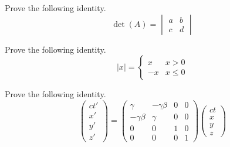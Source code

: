 \documentclass[12pt,a5paper]{exam}
\begin{document}
\begin{questions}
\question
Prove the following identity.
\[
\det (A)=\begin{vmatrix} a & b \\ c& d\end{vmatrix}
\]

\question
Prove the following identity.
\[
|x|=\begin{cases} x & x>0\\ -x & x\leq 0\end{cases}
\]

\question
Prove the following identity.
\[
\begin{pmatrix}
ct'\\
x'\\
y'\\
z'
\end{pmatrix}
=
\begin{pmatrix}
\gamma & -\gamma \beta & 0 & 0 \\
-\gamma \beta & \gamma & 0 & 0 \\
0 & 0 & 1 & 0 \\
0 & 0 & 0 & 1
\end{pmatrix}
\begin{pmatrix}
ct\\
x\\
y\\
z
\end{pmatrix}
\]

\end{questions}
\end{document}

